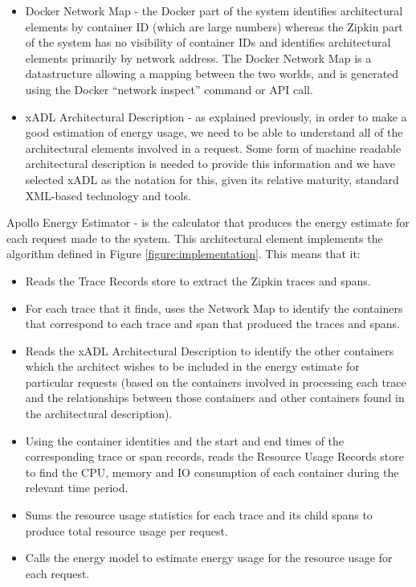 \begin{itemize}
\item Docker Network Map - the Docker part of the system identifies architectural elements by container ID (which are large numbers) whereas the Zipkin part of the system has no visibility of container IDs and identifies architectural elements primarily by network address.  The Docker Network Map is a datastructure allowing a mapping between the two worlds, and is generated using the Docker “network inspect” command or API call.
\item xADL Architectural Description - as explained previously, in order to make a good estimation of energy usage, we need to be able to understand all of the architectural elements involved in a request.  Some form of machine readable architectural description is needed to provide this information and we have selected xADL as the notation for this, given its relative maturity, standard XML-based technology and tools.
\end{itemize}

Apollo Energy Estimator - is the calculator that produces the energy estimate for each request made to the system.  This architectural element implements the algorithm defined in Figure \ref{figure:implementation}. This means that it:

\begin{itemize}
\item Reads the Trace Records store to extract the Zipkin traces and spans.
\item For each trace that it finds, uses the Network Map to identify the containers that correspond to each trace and span that produced the traces and spans.
\item Reads the xADL Architectural Description to identify the other containers which the architect wishes to be included in the energy estimate for particular requests (based on the containers involved in processing each trace and the relationships between those containers and other containers found in the architectural description).
\item Using the container identities and the start and end times of the corresponding trace or span records, reads the Resource Usage Records store to find the CPU, memory and IO consumption of each container during the relevant time period. 
\item Sums the resource usage statistics for each trace and its child spans to produce total resource usage per request.
\item Calls the energy model to estimate energy usage for the resource usage for each request.
\end{itemize}

